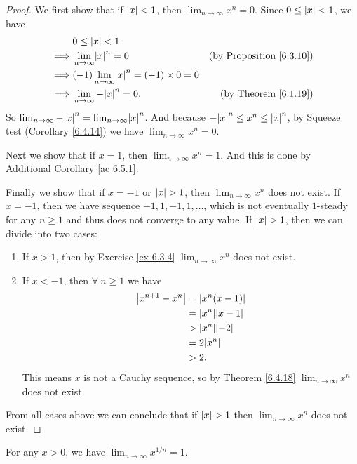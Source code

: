 \begin{proof}
We first show that if \(\abs*{x} < 1\), then \(\lim_{n \to \infty} x^n = 0\).
Since \(0 \leq \abs*{x} < 1\), we have
\begin{align*}
& 0 \leq \abs*{x} < 1 \\
\implies & \lim_{n \to \infty} \abs*{x}^n = 0 & \text{(by Proposition \ref{6.3.10})} \\
\implies & (-1)\lim_{n \to \infty} \abs*{x}^n = (-1) \times 0 = 0 \\
\implies & \lim_{n \to \infty} -\abs*{x}^n = 0. & \text{(by Theorem \ref{6.1.19})}
\end{align*}
So \(\lim_{n \to \infty} -\abs*{x}^n = \lim_{n \to \infty} \abs*{x}^n\).
And because \(-\abs*{x}^n \leq x^n \leq \abs*{x}^n\), by Squeeze test (Corollary \ref{6.4.14}) we have \(\lim_{n \to \infty} x^n = 0\).

Next we show that if \(x = 1\), then \(\lim_{n \to \infty} x^n = 1\).
And this is done by Additional Corollary \ref{ac 6.5.1}.

Finally we show that if \(x = -1\) or \(\abs*{x} > 1\), then \(\lim_{n \to \infty} x^n\) does not exist.
If \(x = -1\), then we have sequence \(-1, 1, -1, 1, \dots\), which is not eventually \(1\)-steady for any \(n \geq 1\) and thus does not converge to any value.
If \(\abs*{x} > 1\), then we can divide into two cases:
\begin{enumerate}
    \item If \(x > 1\), then by Exercise \ref{ex 6.3.4} \(\lim_{n \to \infty} x^n\) does not exist.
    \item If \(x < -1\), then \(\forall\ n \geq 1\) we have
    \begin{align*}
        \abs*{x^{n + 1} - x^n} &= \abs*{x^n(x - 1)} \\
        &= \abs*{x^n}\abs*{x - 1} \\
        &> \abs*{x^n}\abs*{-2} \\
        &= 2\abs*{x^n} \\
        &> 2.
    \end{align*}
    This means \(x\) is not a Cauchy sequence, so by Theorem \ref{6.4.18} \(\lim_{n \to \infty} x^n\) does not exist.
\end{enumerate}
From all cases above we can conclude that if \(\abs*{x} > 1\) then \(\lim_{n \to \infty} x^n\) does not exist.
\end{proof}

\begin{lemma}\label{6.5.3}
For any \(x > 0\), we have \(\lim_{n \to \infty} x^{1 / n} = 1\).
\end{lemma}


